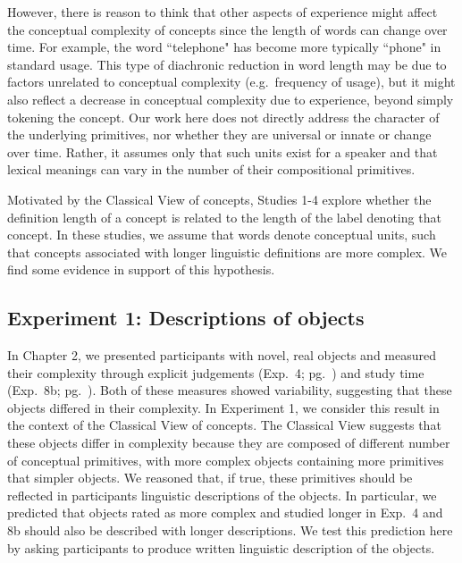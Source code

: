 However, there is reason to think that other aspects of experience might affect the conceptual complexity of concepts since the length of words can change over time. For example, the word ``telephone" has become more typically ``phone" in standard usage. This type of  diachronic reduction in word length may be due to factors  unrelated to conceptual complexity (e.g.\ frequency of usage), but it might also reflect a decrease in conceptual complexity due to experience, beyond simply tokening the concept. Our work here does not directly address the character of the underlying  primitives, nor whether they are universal or innate or change over time. Rather, it assumes only that such units exist for a speaker and that lexical meanings can vary in the number of their compositional primitives. 

Motivated by the Classical View of concepts, Studies 1-4  explore whether the definition length of a concept  is related to the length of the label denoting that concept. In these studies, we assume that words denote conceptual units, such that concepts associated with longer linguistic definitions are  more complex. We find some evidence in support of this hypothesis.









\subsection{Experiment 1: Descriptions of objects}
In Chapter 2, we presented participants with novel, real objects and measured their complexity through explicit judgements (Exp.\ 4; pg.\ \pageref{ch2-4}) and study time (Exp.\ 8b; pg.\ \pageref{ch2-8b}). Both of these measures showed variability, suggesting that these objects differed in their complexity. 
In Experiment 1, we consider this result in the context of the Classical View of concepts. The Classical View suggests that these objects differ in complexity because they are composed of different number of conceptual primitives, with more complex objects containing more primitives that simpler objects. We reasoned that, if true, these primitives should be reflected in participants linguistic descriptions of the objects. In particular, we predicted that objects rated as more complex and studied longer in Exp.\ 4 and 8b should also be described with longer descriptions. We test this prediction here by asking participants to produce written linguistic description of the objects.


